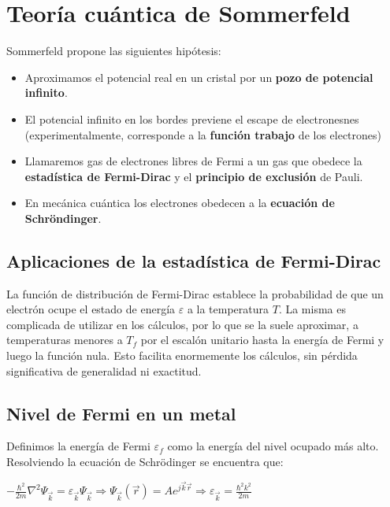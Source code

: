 \documentclass[oneside]{book}
\numberwithin{equation}{section}
\numberwithin{figure}{section}
\numberwithin{table}{section}
\begin{document}
		\section{Teoría cuántica de Sommerfeld}	
		
			Sommerfeld propone las siguientes hipótesis:
			
			\begin{itemize}
				\item Aproximamos el potencial real en un cristal por un \textbf{pozo de potencial infinito}.
				\item El potencial infinito en los bordes previene el escape de electronesnes (experimentalmente, corresponde a la \textbf{función trabajo} de los electrones)
				\item Llamaremos gas de electrones libres de Fermi a un gas que obedece la \textbf{estadística de Fermi-Dirac} y el \textbf{principio de exclusión} de Pauli.
				\item En mecánica cuántica los electrones obedecen a la \textbf{ecuación de Schröndinger}.	
		
		\end{itemize}	
		
			\subsection{Aplicaciones de la estadística de Fermi-Dirac}
			
				La función de distribución de Fermi-Dirac establece la probabilidad de que un electrón ocupe el estado de energía $\varepsilon$ a la temperatura $T$. La misma es complicada de utilizar en los cálculos, por lo que se la suele aproximar, a temperaturas menores a $T_f$ por el escalón unitario hasta la energía de Fermi y luego la función nula. Esto facilita enormemente los cálculos, sin pérdida significativa de generalidad ni exactitud.
			
			\subsection{Nivel de Fermi en un metal}		
			
				Definimos la energía de Fermi $\varepsilon_f$ como la energía del nivel ocupado más alto. Resolviendo la ecuación de Schrödinger se encuentra que:\\
				
				\begin{center}
					$\displaystyle -\frac{\hbar^2}{2m}\nabla^2\Psi_{\vec{k}}=\varepsilon_{\vec{k}}\Psi_{\vec{k}} \Rightarrow \Psi_{\vec{k}}(\vec{r})=A e^{j\vec{k}\vec{r}} \Rightarrow \varepsilon_{\vec{k}}=\frac{\hbar^2 k^2}{2m} $
				\end{center}
				
\end{document}
